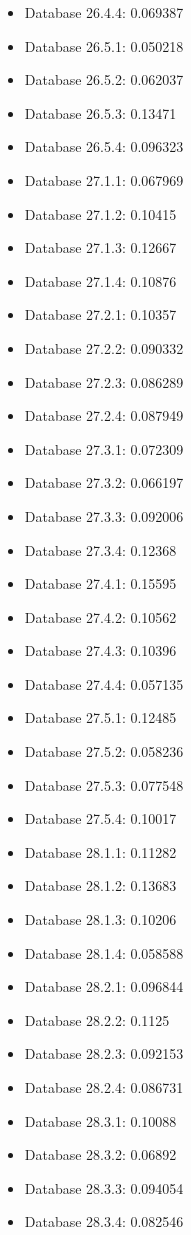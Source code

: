\begin{itemize}
\item Database 26.4.4: 0.069387
\item Database 26.5.1: 0.050218
\item Database 26.5.2: 0.062037
\item Database 26.5.3: 0.13471
\item Database 26.5.4: 0.096323
\item Database 27.1.1: 0.067969
\item Database 27.1.2: 0.10415
\item Database 27.1.3: 0.12667
\item Database 27.1.4: 0.10876
\item Database 27.2.1: 0.10357
\item Database 27.2.2: 0.090332
\item Database 27.2.3: 0.086289
\item Database 27.2.4: 0.087949
\item Database 27.3.1: 0.072309
\item Database 27.3.2: 0.066197
\item Database 27.3.3: 0.092006
\item Database 27.3.4: 0.12368
\item Database 27.4.1: 0.15595
\item Database 27.4.2: 0.10562
\item Database 27.4.3: 0.10396
\item Database 27.4.4: 0.057135
\item Database 27.5.1: 0.12485
\item Database 27.5.2: 0.058236
\item Database 27.5.3: 0.077548
\item Database 27.5.4: 0.10017
\item Database 28.1.1: 0.11282
\item Database 28.1.2: 0.13683
\item Database 28.1.3: 0.10206
\item Database 28.1.4: 0.058588
\item Database 28.2.1: 0.096844
\item Database 28.2.2: 0.1125
\item Database 28.2.3: 0.092153
\item Database 28.2.4: 0.086731
\item Database 28.3.1: 0.10088
\item Database 28.3.2: 0.06892
\item Database 28.3.3: 0.094054
\item Database 28.3.4: 0.082546

\end{itemize}
